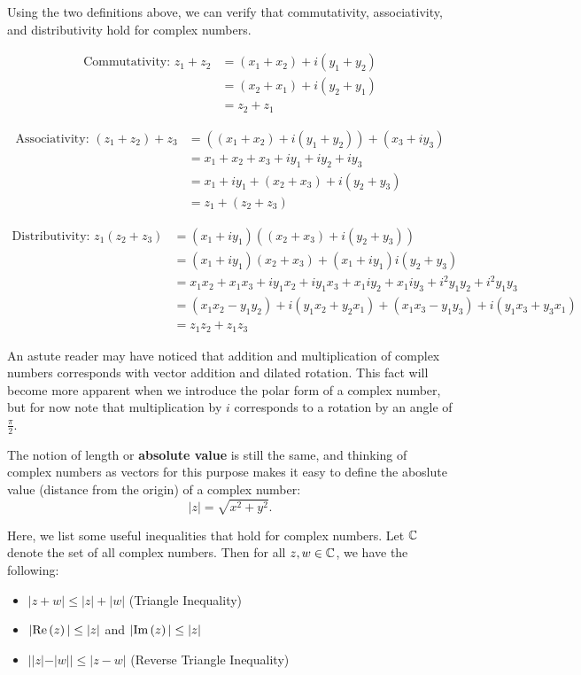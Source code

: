 \documentclass{exam}
\begin{document}
\newpage

Using the two definitions above, we can verify that commutativity, associativity, and distributivity
hold for complex numbers.

\begin{align*}
    \text{Commutativity: }z_1 + z_2 &= (x_1 + x_2) + i(y_1 + y_2) \\
    &= (x_2 + x_1) + i(y_2 + y_1) \\
    &= z_2 + z_1
\end{align*}

\begin{align*}
    \text{Associativity: }(z_1 + z_2) + z_3 &= ((x_1 + x_2) + i(y_1 + y_2)) + (x_3 + iy_3) \\
    &= x_1 + x_2 + x_3 + iy_1 + iy_2 + iy_3 \\
    &= x_1 + iy_1 + (x_2 + x_3) + i(y_2 + y_3) \\
    &= z_1 + (z_2 + z_3)
\end{align*}

\begin{align*}
    \text{Distributivity: }z_1(z_2 + z_3) &= (x_1 + iy_1)((x_2 + x_3) + i(y_2 + y_3)) \\
    &= (x_1 + iy_1)(x_2 + x_3) + (x_1 + iy_1)i(y_2 + y_3) \\
    &= x_1x_2 + x_1x_3 + iy_1x_2 + iy_1x_3 + x_1iy_2 + x_1iy_3 + i^2y_1y_2 + i^2y_1y_3 \\
    &= (x_1x_2 - y_1y_2) + i(y_1x_2 + y_2x_1) + (x_1x_3 - y_1y_3) + i(y_1x_3 + y_3x_1) \\
    &= z_1z_2 + z_1z_3
\end{align*}

An astute reader may have noticed that addition and multiplication of complex numbers corresponds
with vector addition and dilated rotation. This fact will become more apparent when we introduce
the polar form of a complex number, but for now note that multiplication by $i$ corresponds
to a rotation by an angle of $\frac{\pi}{2}$.

The notion of length or \textbf{absolute value} is still the same, and thinking of complex numbers as vectors
for this purpose makes it easy to define the aboslute value (distance from the origin) of a
complex number:
$$|z| = \sqrt{x^2 + y^2}.$$

Here, we list some useful inequalities that hold for complex numbers. Let $\mathbb{C}$ denote the set of
all complex numbers. Then for all $z, w \in \mathbb{C}$, we have the following:
\begin{itemize}
    \item $|z + w| \leq |z| + |w|$ (Triangle Inequality)
    \item $|\text{Re}\left( z \right)| \leq |z|$ and $|\text{Im}\left( z \right)| \leq |z|$
    \item $||z| - |w|| \leq |z - w|$ (Reverse Triangle Inequality)
\end{itemize}
\end{document}
